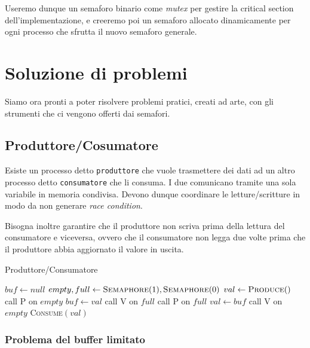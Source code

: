 \documentclass{article}
\begin{document}
Useremo dunque un semaforo binario come \emph{mutex} per gestire la critical
section dell'implementazione, e creeremo poi un semaforo allocato dinamicamente
per ogni processo che sfrutta il nuovo semaforo generale.

\section{Soluzione di problemi}

Siamo ora pronti a poter risolvere problemi pratici, creati ad arte, con gli
strumenti che ci vengono offerti dai semafori.

\subsection{Produttore/Cosumatore}

Esiste un processo detto \texttt{produttore} che vuole trasmettere dei dati ad
un altro processo detto \texttt{consumatore} che li consuma. I due comunicano
tramite una sola variabile in memoria condivisa. Devono dunque coordinare le
letture/scritture in modo da non generare \emph{race condition}.

Bisogna inoltre garantire che il produttore non scriva prima della lettura del
consumatore e viceversa, ovvero che il consumatore non legga due volte prima
che il produttore abbia aggiornato il valore in uscita.

\begin{algorithm}[H]
  \caption{Produttore/Consumatore}
  \begin{algorithmic}[0]
    \State $buf \gets null$
    \State $empty, full \gets \textsc{Semaphore}(1), \textsc{Semaphore}(0)$
    \State
        \State $val \gets \textsc{Produce}()$
        \State call \textsc{P} on $empty$
        \State $buf \gets val$
        \State call \textsc{V} on $full$
      \EndWhile
    \EndProcedure
    \State
        \State call \textsc{P} on $full$
        \State $val \gets buf$
        \State call \textsc{V} on $empty$
        \State \textsc{Consume}$(val)$
      \EndWhile
    \EndProcedure
  \end{algorithmic}
\end{algorithm}

\subsubsection{Problema del buffer limitato}
\end{document}
